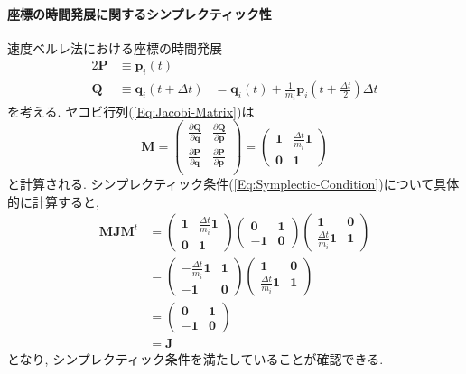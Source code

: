 \paragraph{座標の時間発展に関するシンプレクティック性}
速度ベルレ法における座標の時間発展
\begin{alignat}{2}
  \bm{P}
  &\equiv
  \bm{p}_{i}(t)
  \\
  \bm{Q}
  &\equiv
  \bm{q}_{i} (t + \Delta t)
  &=
  \bm{q}_{i}(t) +
  \frac{1}{m_{i}} \bm{p}_{i}\left(t + \frac{\Delta t}{2}\right) \Delta t
\end{alignat}
を考える. ヤコビ行列(\ref{Eq:Jacobi-Matrix})は
\begin{equation}
  \bm{M}
  =
  \begin{pmatrix}
    \frac{\partial \bm{Q}}{\partial \bm{q}} &
    \frac{\partial \bm{Q}}{\partial \bm{p}} \\
    \frac{\partial \bm{P}}{\partial \bm{q}} &
    \frac{\partial \bm{P}}{\partial \bm{p}} \\
  \end{pmatrix}
  =
  \begin{pmatrix}
    \bm{1} &
    \frac{\Delta t}{m_{i}} \bm{1} \\
    \bm{0} &
    \bm{1}
  \end{pmatrix}
\end{equation}
と計算される. シンプレクティック条件(\ref{Eq:Symplectic-Condition})について具体的に計算すると, 
\begin{align}
  \bm{M}\bm{J}\bm{M}^{t}
  &=
  \begin{pmatrix}
    \bm{1} &
    \frac{\Delta t}{m_{i}} \bm{1} \\
    \bm{0} &
    \bm{1}
  \end{pmatrix}
  \begin{pmatrix}
     \bm{0} & \bm{1} \\
    -\bm{1} & \bm{0}
  \end{pmatrix}
  \begin{pmatrix}
    \bm{1} &
    \bm{0} \\
    \frac{\Delta t}{m_{i}} \bm{1} &
    \bm{1}
  \end{pmatrix}
  \\
  &=
  \begin{pmatrix}
    -\frac{\Delta t}{m_{i}} \bm{1} &
     \bm{1} \\
    -\bm{1} &
     \bm{0}
  \end{pmatrix}
  \begin{pmatrix}
     \bm{1} &
     \bm{0} \\
     \frac{\Delta t}{m_{i}} \bm{1} &
     \bm{1}
  \end{pmatrix}
  \\
  &=
  \begin{pmatrix}
     \bm{0} & \bm{1}\\
    -\bm{1} & \bm{0}
  \end{pmatrix}
  \\
  &=
  \bm{J}
\end{align}
となり, シンプレクティック条件を満たしていることが確認できる. 

